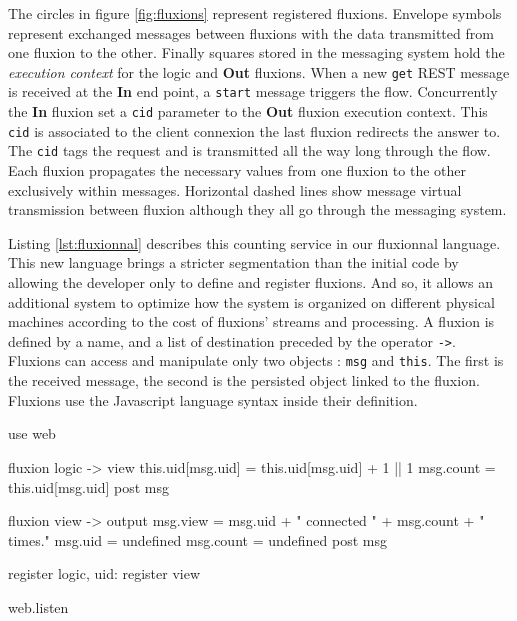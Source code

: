 The circles in figure \ref{fig:fluxions} represent registered fluxions.
Envelope symbols represent exchanged messages between fluxions with the data transmitted from one fluxion to the other. Finally squares stored in the messaging system hold the \textit{execution context} for the logic and \textbf{Out} fluxions.
When a new \texttt{get} REST message is received at the \textbf{In} end point, a \texttt{start} message triggers the flow.
Concurrently the \textbf{In} fluxion set a \texttt{cid} parameter to the \textbf{Out} fluxion execution context.
This \texttt{cid} is associated to the client connexion the last fluxion redirects the answer to.
The \texttt{cid} tags the request and is transmitted all the way long through the flow.
Each fluxion propagates the necessary values from one fluxion to the other exclusively within messages.
Horizontal dashed lines show message virtual transmission between fluxion although they all go through the messaging system.

Listing \ref{lst:fluxionnal} describes this counting service in our fluxionnal language.
This new language brings a stricter segmentation than the initial code by allowing the developer only to define and register fluxions.
And so, it allows an additional system to optimize how the system is organized on different physical machines according to the cost of fluxions' streams and processing.
A fluxion is defined by a name, and a list of destination preceded by the operator \texttt{-}\texttt{>}.
Fluxions can access and manipulate only two objects : \texttt{msg} and \texttt{this}.
The first is the received message, the second is the persisted object linked to the fluxion.
Fluxions use the Javascript language syntax inside their definition.


\begin{code}[Javascript, caption={Fluxionnal sample},label={lst:fluxionnal}]
use web

fluxion logic -> view
  this.uid[msg.uid] = this.uid[msg.uid] + 1 || 1
  msg.count = this.uid[msg.uid]
  post msg

fluxion view -> output
  msg.view = msg.uid + " connected " + msg.count + " times."
  msg.uid = undefined
  msg.count = undefined
  post msg

register logic, {uid: {}}
register view

web.listen
\end{code}

